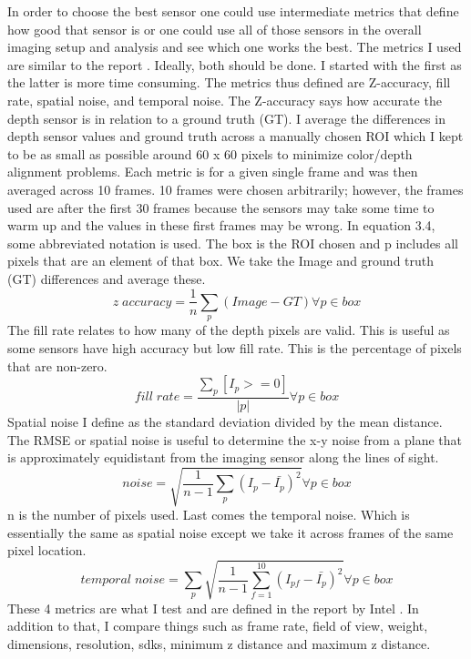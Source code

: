 In order to choose the best sensor one could use intermediate metrics that define how good that sensor is or one could use all of those sensors in the overall imaging setup and analysis and see which one works the best. The metrics I used are similar to the report \cite{depthtesting}. Ideally, both should be done. I started with the first as the latter is more time consuming. The metrics thus defined are Z-accuracy, fill rate, spatial noise, and temporal noise. The Z-accuracy says how accurate the depth sensor is in relation to a ground truth (GT). I average the differences in depth sensor values and ground truth across a manually chosen ROI which I kept to be as small as possible around 60 x 60 pixels to minimize color/depth alignment problems. Each metric is for a given single frame and was then averaged across 10 frames. 10 frames were chosen arbitrarily; however, the frames used are after the first 30 frames because the sensors may take some time to warm up and the values in these first frames may be wrong. In equation 3.4, some abbreviated notation is used. The box is the ROI chosen and p includes all pixels that are an element of that box. We take the Image and ground truth (GT) differences and average these.
\begin{equation}
	z \; accuracy = \frac{1}{n}\sum_p(Image - GT) \forall p \in box
\end{equation}
The fill rate relates to how many of the depth pixels are valid. This is useful as some sensors have high accuracy but low fill rate. This is the percentage of pixels that are non-zero.
\begin{equation}
	fill \; rate = \frac{\sum_p[I_p >= 0]}{\vert p \vert} \forall p \in box
\end{equation}
Spatial noise I define as the standard deviation divided by the mean distance.
The RMSE or spatial noise is useful to determine the x-y noise from a plane that is approximately equidistant from the imaging sensor along the lines of sight.
\begin{equation}
	noise = \sqrt{\frac{1}{n-1}\sum_p(I_p-{\bar{I_p}})^2} \forall p \in box
\end{equation}
n is the number of pixels used.
Last comes the temporal noise. Which is essentially the same as spatial noise except we take it across frames of the same pixel location.
\begin{equation}
	temporal \; noise = \sum_p\sqrt{\frac{1}{n-1}\sum_{f=1}^{10}(I_{pf}-\bar{I_p})^2} \forall p \in box
\end{equation}
These 4 metrics are what I test and are defined in the report by Intel \cite{depthtesting}. In addition to that, I compare things such as frame rate, field of view, weight, dimensions, resolution, sdks, minimum z distance and maximum z distance.

